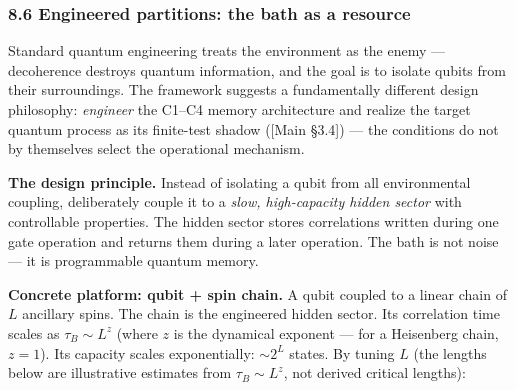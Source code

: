 \documentclass[
]{article}
\begin{document}
\hypertarget{engineered-partitions-the-bath-as-a-resource}{%
\subsubsection{8.6 Engineered partitions: the bath as a
resource}\label{engineered-partitions-the-bath-as-a-resource}}

Standard quantum engineering treats the environment as the enemy ---
decoherence destroys quantum information, and the goal is to isolate
qubits from their surroundings. The framework suggests a fundamentally
different design philosophy: \emph{engineer} the C1--C4 memory
architecture and realize the target quantum process as its finite-test
shadow ({[}Main §3.4{]}) --- the conditions do not by themselves select
the operational mechanism.

\textbf{The design principle.} Instead of isolating a qubit from all
environmental coupling, deliberately couple it to a \emph{slow,
high-capacity hidden sector} with controllable properties. The hidden
sector stores correlations written during one gate operation and returns
them during a later operation. The bath is not noise --- it is
programmable quantum memory.

\textbf{Concrete platform: qubit + spin chain.} A qubit coupled to a
linear chain of \(L\) ancillary spins. The chain is the engineered
hidden sector. Its correlation time scales as \(\tau_B \sim L^z\) (where
\(z\) is the dynamical exponent --- for a Heisenberg chain, \(z = 1\)).
Its capacity scales exponentially: \(\sim 2^L\) states. By tuning \(L\)
(the lengths below are illustrative estimates from \(\tau_B \sim L^z\),
not derived critical lengths):
\end{document}
